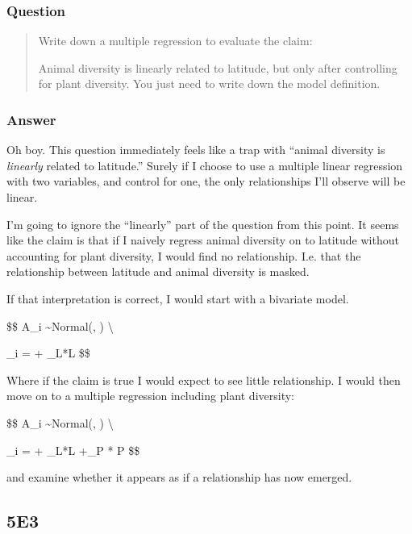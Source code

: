 \documentclass[
]{book}
\begin{document}
\hypertarget{question-46}{%
\subsubsection*{Question}\label{question-46}}

\begin{quote}
Write down a multiple regression to evaluate the claim:

Animal diversity is linearly related to latitude, but only after controlling for plant diversity. You just need to write down the model definition.
\end{quote}

\hypertarget{answer-46}{%
\subsubsection*{Answer}\label{answer-46}}

Oh boy. This question immediately feels like a trap with ``animal diversity is \emph{linearly} related to latitude.'' Surely if I choose to use a multiple linear regression with two variables, and control for one, the only relationships I'll observe will be linear.

I'm going to ignore the ``linearly'' part of the question from this point. It seems like the claim is that if I naively regress animal diversity on to latitude without accounting for plant diversity, I would find no relationship. I.e. that the relationship between latitude and animal diversity is masked.

If that interpretation is correct, I would start with a bivariate model.

\$\$
A\_i \sim Normal(\mu, \sigma) \textbackslash{}

\mu\_i = \alpha + \beta\_L*L
\$\$

Where if the claim is true I would expect to see little relationship. I would then move on to a multiple regression including plant diversity:

\$\$
A\_i \sim Normal(\mu, \sigma) \textbackslash{}

\mu\_i = \alpha + \beta\_L*L +\beta\_P * P
\$\$

and examine whether it appears as if a relationship has now emerged.

\hypertarget{e3-3}{%
\subsection*{5E3}\label{e3-3}}
\end{document}
